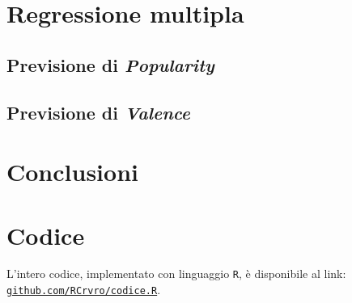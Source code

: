 \documentclass[fleqn,10pt]{SelfArx} %
\begin{document}
\section{Regressione multipla}
\subsection{Previsione di \textit{Popularity}}
\subsection{Previsione di \textit{Valence}}
\section{Conclusioni}

\section*{Codice}
L'intero codice, implementato con linguaggio \texttt{R}, è disponibile al link: \href{https://github.com/RCrvro/Foundation-of-Prob.-and-Stat.---Final-Project/blob/master/codice.R}{\texttt{github.com/RCrvro/codice.R}}.

\clearpage


\begin{thebibliography}{9}


\end{thebibliography}
\end{document}
